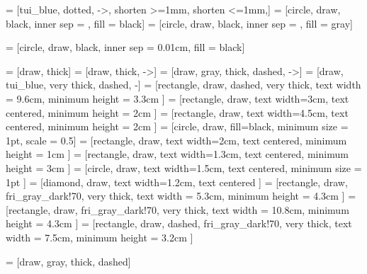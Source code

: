 
 = [tui_blue, dotted, ->, shorten >=1mm, shorten <=1mm,]
 = [circle, draw, black, inner sep = \rCircle, fill = black]
 = [circle, draw, black, inner sep = \rCircleCamera, fill = gray]

 = [circle, draw, black, inner sep = 0.01cm, fill = black]

 = [draw, thick]
 = [draw, thick, ->]
 = [draw, gray, thick, dashed, ->]
 = [draw, tui_blue, very thick, dashed, -]
 = [rectangle, draw, dashed, very thick, 
text width = 9.6cm,  minimum height = 3.3cm
]
 = [rectangle, draw,  
	text width=3cm, text centered, minimum height = 2cm
	]
 = [rectangle, draw,  
	text width=4.5cm, text centered, minimum height = 2cm
	]
 = [circle, draw, fill=black, minimum size = 1pt, scale = 0.5]
 = [rectangle, draw,  
text width=2cm, text centered, minimum height = 1cm
]
 = [rectangle, draw,  
text width=1.3cm, text centered, minimum height = 3cm
]
 = [circle, draw,  
text width=1.5cm, text centered, minimum size = 1pt
]
 = [diamond, draw,  
text width=1.2cm, text centered
]
 = [rectangle, draw, fri_gray_dark!70, very thick, 
text width = 5.3cm,  minimum height = 4.3cm
]
 = [rectangle, draw, fri_gray_dark!70, very thick, 
text width = 10.8cm,  minimum height = 4.3cm
]
 = [rectangle, draw, dashed, fri_gray_dark!70, very thick, 
text width = 7.5cm,  minimum height = 3.2cm
]


 = [draw, gray, thick, dashed]
